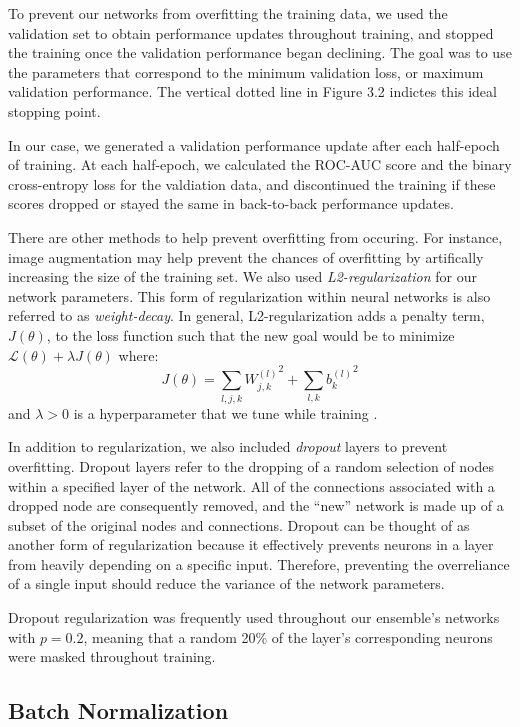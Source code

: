 \documentclass [MAS] {uclathes}
\begin{document}
To prevent our networks from overfitting the training data, we used the validation set to obtain performance updates throughout training, and stopped the training once the validation performance began declining. The goal was to use the parameters that correspond to the minimum validation loss, or maximum validation performance. The vertical dotted line in Figure 3.2 indictes this ideal stopping point. 

In our case, we generated a validation performance update after each half-epoch of training. At each half-epoch, we calculated the ROC-AUC score and the binary cross-entropy loss for the valdiation data, and discontinued the training if these scores dropped or stayed the same in back-to-back performance updates.

There are other methods to help prevent overfitting from occuring. For instance, image augmentation may help prevent the chances of overfitting by artifically increasing the size of the training set. We also used \textit{L2-regularization} for our network parameters. This form of regularization within neural networks is also referred to as \textit{weight-decay}. In general, L2-regularization adds a penalty term, $J(\theta)$, to the loss function such that the new goal would be to minimize $\mathcal{L}(\theta) + \lambda J(\theta)$ where: $$J(\theta) = \sum_{l, j, k} {W^{(l)}_{j, k}}^2 + \sum_{l, k} {b^{(l)}_{k}}^2$$ and $\lambda > 0$ is a hyperparameter that we tune while training \cite{ESL}. 

In addition to regularization, we also included \textit{dropout} layers to prevent overfitting. Dropout layers refer to the dropping of a random selection of nodes within a specified layer of the network. All of the connections associated with a dropped node are consequently removed, and the ``new'' network is made up of a subset of the original nodes and connections. Dropout can be thought of as another form of regularization because it effectively prevents neurons in a layer from heavily depending on a specific input. Therefore, preventing the overreliance of a single input should reduce the variance of the network parameters. 

Dropout regularization was frequently used throughout our ensemble's networks with $p = 0.2$, meaning that a random 20\% of the layer's corresponding neurons were masked throughout training. 


\subsection{Batch Normalization}
\end{document}
